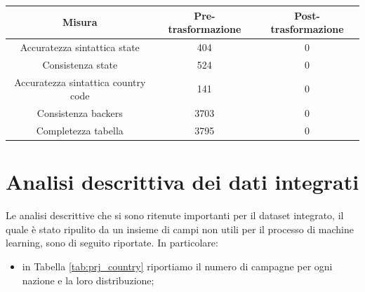 \begin{tabular}{|c|c|c|}
	\hline 
	Misura & Pre-trasformazione & Post-trasformazione \\ 
	\hline 
	Accuratezza sintattica state & 404 & 0 \\ 
	\hline 
	Consistenza state & 524 & 0 \\ 
	\hline 
	Accuratezza sintattica country code & 141 & 0 \\ 
	\hline 
	Consistenza backers & 3703 & 0 \\ 
	\hline 
	Completezza tabella & 3795 & 0 \\ 
	\hline 
\end{tabular} 

\section{Analisi descrittiva dei dati integrati}
Le analisi descrittive che si sono ritenute importanti per il dataset integrato, il quale è stato ripulito da un insieme di campi non utili per il processo di machine learning, sono di seguito riportate.
In particolare:
\begin{itemize}
	\item in Tabella \ref{tab:prj_country} riportiamo il numero di campagne per ogni nazione e la loro distribuzione;
\end{itemize} 

